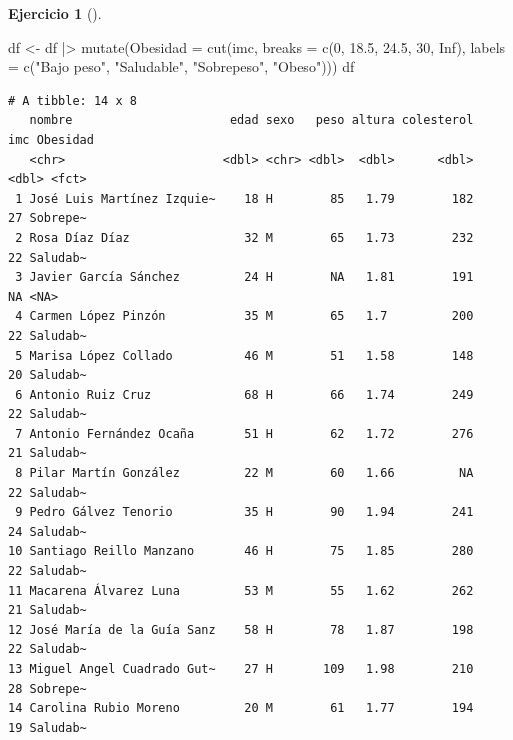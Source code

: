 \documentclass[
  a4paper,
]{scrreport}
\newenvironment{Shaded}{\begin{snugshade}}{\end{snugshade}}
\newcommand{\AttributeTok}[1]{\textcolor[rgb]{0.40,0.45,0.13}{#1}}
\newcommand{\ConstantTok}[1]{\textcolor[rgb]{0.56,0.35,0.01}{#1}}
\newcommand{\DecValTok}[1]{\textcolor[rgb]{0.68,0.00,0.00}{#1}}
\newcommand{\FloatTok}[1]{\textcolor[rgb]{0.68,0.00,0.00}{#1}}
\newcommand{\FunctionTok}[1]{\textcolor[rgb]{0.28,0.35,0.67}{#1}}
\newcommand{\NormalTok}[1]{\textcolor[rgb]{0.00,0.23,0.31}{#1}}
\newcommand{\OtherTok}[1]{\textcolor[rgb]{0.00,0.23,0.31}{#1}}
\newcommand{\SpecialCharTok}[1]{\textcolor[rgb]{0.37,0.37,0.37}{#1}}
\newcommand{\StringTok}[1]{\textcolor[rgb]{0.13,0.47,0.30}{#1}}
\theoremstyle{definition}
\newtheorem{exercise}{Ejercicio}[chapter]
\theoremstyle{remark}
\begin{document}
\begin{exercise}[]
\begin{enumerate}
  \begin{tcolorbox}[enhanced jigsaw, coltitle=black, left=2mm, colback=white, leftrule=.75mm, toptitle=1mm, breakable, bottomrule=.15mm, titlerule=0mm, bottomtitle=1mm, title=\textcolor{quarto-callout-tip-color}{\faLightbulb}\hspace{0.5em}{Solución}, arc=.35mm, toprule=.15mm, rightrule=.15mm, colframe=quarto-callout-tip-color-frame, opacityback=0, colbacktitle=quarto-callout-tip-color!10!white, opacitybacktitle=0.6]

\begin{Shaded}
\begin{Highlighting}[]
\NormalTok{df }\OtherTok{\textless{}{-}}\NormalTok{ df }\SpecialCharTok{|\textgreater{}}
    \FunctionTok{mutate}\NormalTok{(}\AttributeTok{Obesidad =} \FunctionTok{cut}\NormalTok{(imc, }\AttributeTok{breaks =} \FunctionTok{c}\NormalTok{(}\DecValTok{0}\NormalTok{, }\FloatTok{18.5}\NormalTok{, }\FloatTok{24.5}\NormalTok{, }\DecValTok{30}\NormalTok{, }\ConstantTok{Inf}\NormalTok{), }\AttributeTok{labels =} \FunctionTok{c}\NormalTok{(}\StringTok{"Bajo peso"}\NormalTok{, }\StringTok{"Saludable"}\NormalTok{, }\StringTok{"Sobrepeso"}\NormalTok{, }\StringTok{"Obeso"}\NormalTok{)))}
\NormalTok{df}
\end{Highlighting}
\end{Shaded}

\begin{verbatim}
# A tibble: 14 x 8
   nombre                      edad sexo   peso altura colesterol   imc Obesidad
   <chr>                      <dbl> <chr> <dbl>  <dbl>      <dbl> <dbl> <fct>   
 1 José Luis Martínez Izquie~    18 H        85   1.79        182    27 Sobrepe~
 2 Rosa Díaz Díaz                32 M        65   1.73        232    22 Saludab~
 3 Javier García Sánchez         24 H        NA   1.81        191    NA <NA>    
 4 Carmen López Pinzón           35 M        65   1.7         200    22 Saludab~
 5 Marisa López Collado          46 M        51   1.58        148    20 Saludab~
 6 Antonio Ruiz Cruz             68 H        66   1.74        249    22 Saludab~
 7 Antonio Fernández Ocaña       51 H        62   1.72        276    21 Saludab~
 8 Pilar Martín González         22 M        60   1.66         NA    22 Saludab~
 9 Pedro Gálvez Tenorio          35 H        90   1.94        241    24 Saludab~
10 Santiago Reillo Manzano       46 H        75   1.85        280    22 Saludab~
11 Macarena Álvarez Luna         53 M        55   1.62        262    21 Saludab~
12 José María de la Guía Sanz    58 H        78   1.87        198    22 Saludab~
13 Miguel Angel Cuadrado Gut~    27 H       109   1.98        210    28 Sobrepe~
14 Carolina Rubio Moreno         20 M        61   1.77        194    19 Saludab~
\end{verbatim}


\end{tcolorbox}
\end{enumerate}
\end{exercise}
\end{document}
